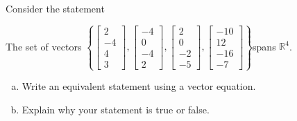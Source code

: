 
\begin{exerciseStatement}


Consider the statement 
\begin{center}\begin{minipage}{0.8\textwidth}
 The set of vectors \( \left\{ \left[\begin{array}{c}
2 \\
-4 \\
4 \\
3
\end{array}\right] , \left[\begin{array}{c}
-4 \\
0 \\
-4 \\
2
\end{array}\right] , \left[\begin{array}{c}
2 \\
0 \\
-2 \\
-5
\end{array}\right] , \left[\begin{array}{c}
-10 \\
12 \\
-16 \\
-7
\end{array}\right] \right\} \)spans \(\mathbb{R}^4\). 
\end{minipage}\end{center}
    


\begin{enumerate}[(a)]
\item  Write an equivalent statement using a vector equation.
\item  Explain why your statement is true or false.
\end{enumerate}
    
\end{exerciseStatement}
    
